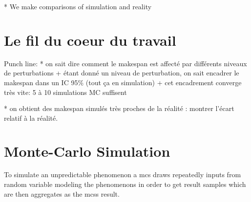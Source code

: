 \documentclass[10pt,conference,compsocconf]{IEEEtran}
\begin{document}
* We make comparisons of simulation and reality

\section{Le fil du coeur du travail}
Punch line:
*  on sait dire comment le makespan est affecté par différents niveaux de
perturbations 
    + étant donné un niveau de perturbation, on sait encadrer le
      makespan dans un IC 95\% (tout ça en simulation)
    + cet encadrement converge très vite: 5 à 10 simulations MC suffisent

* on obtient des makespan simulés très proches de la réalité : montrer l'écart
relatif à la réalité. 


\section{Monte-Carlo Simulation}

To simulate an unpredictable phenomenon a \ac{mcs} draws repeatedly inputs from
random variable modeling the phenomenons in order to get result samples which
are then aggregates as the \acp{mcs} result. 
\end{document}
